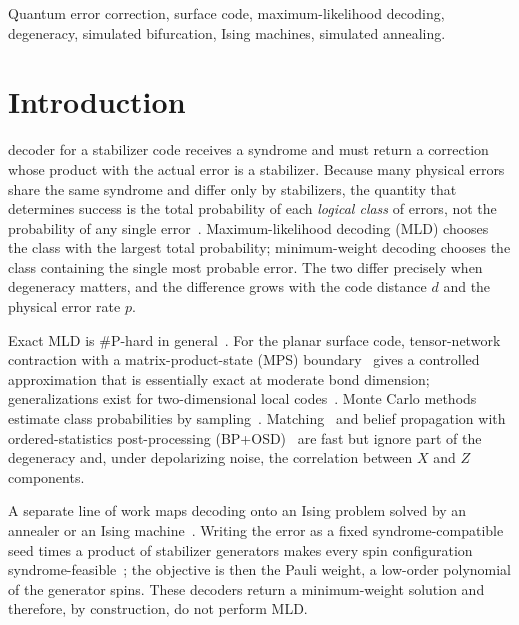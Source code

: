 \documentclass[journal]{IEEEtran}
\begin{document}
\begin{IEEEkeywords}
Quantum error correction, surface code, maximum-likelihood decoding, degeneracy, simulated bifurcation, Ising machines, simulated annealing.
\end{IEEEkeywords}

\section{Introduction}
\label{sec:intro}

 decoder for a stabilizer code receives a syndrome and must return a correction whose product with the actual error is a stabilizer. Because many physical errors share the same syndrome and differ only by stabilizers, the quantity that determines success is the total probability of each \emph{logical class} of errors, not the probability of any single error~\cite{dennis2002}. Maximum-likelihood decoding (MLD) chooses the class with the largest total probability; minimum-weight decoding chooses the class containing the single most probable error. The two differ precisely when degeneracy matters, and the difference grows with the code distance $d$ and the physical error rate $p$.

Exact MLD is \#P-hard in general~\cite{iyer2015}. For the planar surface code, tensor-network contraction with a matrix-product-state (MPS) boundary~\cite{bravyi2014} gives a controlled approximation that is essentially exact at moderate bond dimension; generalizations exist for two-dimensional local codes~\cite{darmawan2018,chubb2021}. Monte Carlo methods estimate class probabilities by sampling~\cite{wootton2012,hutter2014,martinezgarcia2024,tobias2026}. Matching~\cite{edmonds1965,higgott2022,higgott2025} and belief propagation with ordered-statistics post-processing (BP+OSD)~\cite{panteleev2021,roffe2020} are fast but ignore part of the degeneracy and, under depolarizing noise, the correlation between $X$ and $Z$ components.

A separate line of work maps decoding onto an Ising problem solved by an annealer or an Ising machine~\cite{fujisaki2022,fujisaki2023,takeuchi2023,takada2024}. Writing the error as a fixed syndrome-compatible seed times a product of stabilizer generators makes every spin configuration syndrome-feasible~\cite{takeuchi2023,takada2024}; the objective is then the Pauli weight, a low-order polynomial of the generator spins. These decoders return a minimum-weight solution and therefore, by construction, do not perform MLD.
\end{document}
